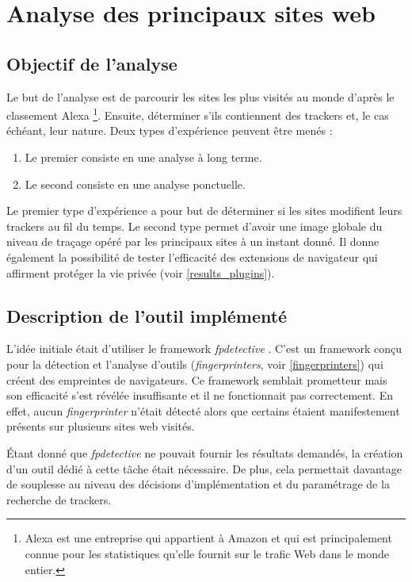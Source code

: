 \chapter{Analyse des principaux sites web}
\section{Objectif de l'analyse}
Le but de l'analyse est de parcourir les sites les plus visités au monde d'après le classement Alexa \footnote{Alexa \cite{AlexaTop} est une entreprise qui appartient à Amazon et qui est principalement connue pour les statistiques qu'elle fournit sur le trafic Web dans le monde entier.}. Ensuite, déterminer s'ils contiennent des trackers et, le cas échéant, leur nature. Deux types d'expérience peuvent être menés :
\begin{enumerate}
	\item Le premier consiste en une analyse à long terme.
	\item Le second consiste en une analyse ponctuelle.
\end{enumerate}

Le premier type d'expérience a pour but de déterminer si les sites modifient leurs trackers au fil du temps.
Le second type permet d'avoir une image globale du niveau de traçage opéré par les principaux sites à un instant donné. Il donne également la possibilité de tester l'efficacité des extensions de navigateur qui affirment protéger la vie privée (voir \autoref{results_plugins}).

\section{Description de l'outil implémenté}
L'idée initiale était d'utiliser le framework \textit{fpdetective} \cite{Acar:2013:FDW:2508859.2516674}. C'est un framework conçu pour la détection et l'analyse d'outils (\textit{fingerprinters}, voir \autoref{fingerprinters}) qui créent des empreintes de navigateurs. Ce framework semblait prometteur mais son efficacité s'est révélée insuffisante et il ne fonctionnait pas correctement. En effet, aucun \textit{fingerprinter} n'était détecté alors que certains étaient manifestement présents sur plusieurs sites web visités.

Étant donné que \textit{fpdetective} ne pouvait fournir les résultats demandés, la création d'un outil dédié à cette tâche était nécessaire. De plus, cela permettait davantage de souplesse au niveau des décisions d'implémentation et du paramétrage de la recherche de trackers.
\newline

